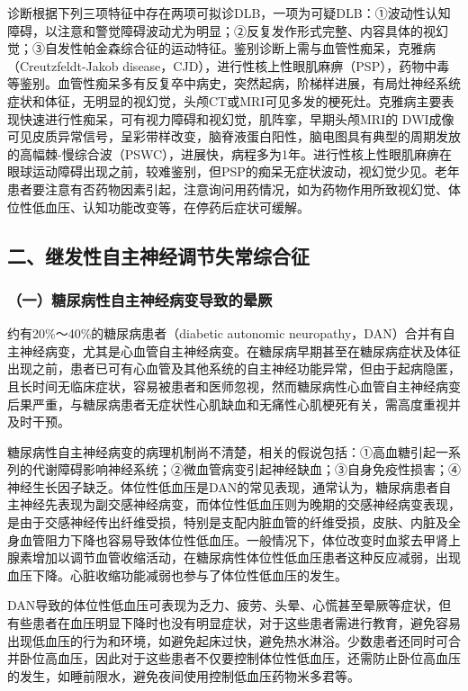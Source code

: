 诊断根据下列三项特征中存在两项可拟诊DLB，一项为可疑DLB：①波动性认知障碍，以注意和警觉障碍波动尤为明显；②反复发作形式完整、内容具体的视幻觉；③自发性帕金森综合征的运动特征。鉴别诊断上需与血管性痴呆，克雅病（Creutzfeldt-Jakob
disease，CJD），进行性核上性眼肌麻痹（PSP），药物中毒等鉴别。血管性痴呆多有反复卒中病史，突然起病，阶梯样进展，有局灶神经系统症状和体征，无明显的视幻觉，头颅CT或MRI可见多发的梗死灶。克雅病主要表现快速进行性痴呆，可有视力障碍和视幻觉，肌阵挛，早期头颅MRI的
DWI成像可见皮质异常信号，呈彩带样改变，脑脊液蛋白阳性，脑电图具有典型的周期发放的高幅棘-慢综合波（PSWC），进展快，病程多为1年。进行性核上性眼肌麻痹在眼球运动障碍出现之前，较难鉴别，但PSP的痴呆无症状波动，视幻觉少见。老年患者要注意有否药物因素引起，注意询问用药情况，如为药物作用所致视幻觉、体位性低血压、认知功能改变等，在停药后症状可缓解。

\subsection{二、继发性自主神经调节失常综合征}

\subsubsection{（一）糖尿病性自主神经病变导致的晕厥}

约有20\%～40\%的糖尿病患者（diabetic autonomic
neuropathy，DAN）合并有自主神经病变，尤其是心血管自主神经病变。在糖尿病早期甚至在糖尿病症状及体征出现之前，患者已可有心血管及其他系统的自主神经功能异常，但由于起病隐匿，且长时间无临床症状，容易被患者和医师忽视，然而糖尿病性心血管自主神经病变后果严重，与糖尿病患者无症状性心肌缺血和无痛性心肌梗死有关，需高度重视并及时干预。

糖尿病性自主神经病变的病理机制尚不清楚，相关的假说包括：①高血糖引起一系列的代谢障碍影响神经系统；②微血管病变引起神经缺血；③自身免疫性损害；④神经生长因子缺乏。体位性低血压是DAN的常见表现，通常认为，糖尿病患者自主神经先表现为副交感神经病变，而体位性低血压则为晚期的交感神经病变表现，是由于交感神经传出纤维受损，特别是支配内脏血管的纤维受损，皮肤、内脏及全身血管阻力下降也容易导致体位性低血压。一般情况下，体位改变时血浆去甲肾上腺素增加以调节血管收缩活动，在糖尿病性体位性低血压患者这种反应减弱，出现血压下降。心脏收缩功能减弱也参与了体位性低血压的发生。

DAN导致的体位性低血压可表现为乏力、疲劳、头晕、心慌甚至晕厥等症状，但有些患者在血压明显下降时也没有明显症状，对于这些患者需进行教育，避免容易出现低血压的行为和环境，如避免起床过快，避免热水淋浴。少数患者还同时可合并卧位高血压，因此对于这些患者不仅要控制体位性低血压，还需防止卧位高血压的发生，如睡前限水，避免夜间使用控制低血压药物米多君等。

